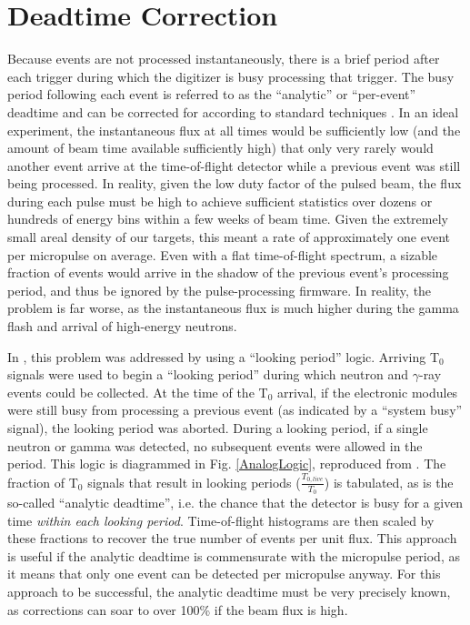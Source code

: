 \section{Deadtime Correction} \label{DeadtimeCorrection}
Because events are not processed instantaneously, there is a brief period
after each trigger during which the digitizer is busy processing that trigger.
The busy period following each event is referred to as the ``analytic'' or
``per-event'' deadtime and can be corrected for according to standard techniques \cite{Moore1980}.
In an ideal experiment, the instantaneous flux at all times would be
sufficiently low (and the amount of beam time available sufficiently high) that
only very rarely would another event arrive at the time-of-flight detector while
a previous event was still being processed. In reality, given the low duty
factor of the pulsed beam, the flux during each pulse must be high to achieve sufficient
statistics over dozens or hundreds of energy bins within a few weeks of beam
time. Given the extremely small areal density of our targets, this meant a rate
of approximately one event per micropulse on average. Even with a flat
time-of-flight spectrum, a sizable fraction of events would arrive in the shadow
of the previous event's processing period, and thus be ignored by the pulse-processing firmware.
In reality, the
problem is far worse, as the instantaneous flux is much higher during the gamma
flash and arrival of high-energy neutrons.

In \cite{Finlay1993, Abfalterer2001}, this problem was addressed by using a
``looking period'' logic. Arriving T$_{0}$ signals were used to begin a ``looking 
period'' during which neutron and $\gamma$-ray
events could be collected. At the time of the T$_{0}$ arrival, if the electronic modules
were still busy from processing a previous event (as indicated by a ``system
busy'' signal),
the looking period was aborted. During a looking period, if a single neutron or gamma
was detected, no subsequent events were allowed in the period.
This logic is diagrammed in Fig. \ref{AnalogLogic}, reproduced from
\cite{Abfalterer2001}. The fraction of T$_{0}$ signals that result in looking
periods ($\frac{T_{0,live}}{T_{0}}$) is tabulated, as is the so-called ``analytic deadtime'', i.e. 
the chance that the detector is busy for a given time \textit{within each looking period}.
Time-of-flight histograms are then scaled by these
fractions to recover the true number of events per unit flux. This approach is useful if the
analytic deadtime is commensurate with the micropulse period, as it means that
only one event can be detected per micropulse anyway. For this approach to be successful, the
analytic deadtime must be very precisely known, as corrections can soar to over 100\%
if the beam flux is high.

